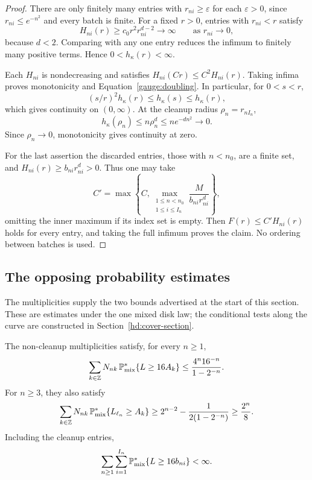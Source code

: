 \begin{proof}
There are only finitely many entries with \(r_{ni}\ge\varepsilon\)
for each \(\varepsilon>0\), since \(r_{ni}\le e^{-n^2}\) and
every batch is finite. For a fixed \(r>0\), entries with
\(r_{ni}<r\) satisfy
\[
H_{ni}(r)\ge c_0r^2r_{ni}^{d-2}\longrightarrow\infty
\qquad\text{as }r_{ni}\longrightarrow0,
\]
because \(d<2\). Comparing with any one entry reduces the infimum
to finitely many positive terms. Hence \(0<h_\kappa(r)<\infty\).

Each \(H_{ni}\) is nondecreasing and satisfies
\(H_{ni}(Cr)\le C^2H_{ni}(r)\). Taking infima proves
monotonicity and Equation~\eqref{gauge:doubling}. In particular,
for \(0<s<r\),
\[
(s/r)^2h_\kappa(r)\le h_\kappa(s)\le h_\kappa(r),
\]
which gives continuity on \((0,\infty)\). At the cleanup radius
\(\rho_n=r_{nI_n}\),
\[
h_\kappa(\rho_n)\le n\rho_n^d\le ne^{-dn^2}\longrightarrow0.
\]
Since \(\rho_n\to0\), monotonicity gives continuity at zero.

For the last assertion the discarded entries, those with \(n<n_0\),
are a finite set, and \(H_{ni}(r)\ge b_{ni}r_{ni}^d>0\).
Thus one may take
\[
C'=\max\left\{C,
\max_{\substack{1\le n<n_0\\1\le i\le I_n}}
\frac{M}{b_{ni}r_{ni}^d}\right\},
\]
omitting the inner maximum if its index set is empty.
Then \(F(r)\le C'H_{ni}(r)\) holds for every entry, and taking
the full infimum proves the claim. No ordering between batches
is used.
\end{proof}

\subsection{The opposing probability estimates}

The multiplicities supply the two bounds advertised at the start of
this section. These are estimates under the one mixed disk law; the
conditional tests along the curve are constructed in
Section~\ref{hd:cover-section}.

\begin{lemma}\label{gauge:multiplicity}
The non-cleanup multiplicities satisfy, for every \(n\ge1\),
\begin{equation}\label{gauge:upper-tail}
\sum_{k\in\mathbb Z}N_{nk}\,
\mathbb P^*_{\mathrm{mix}}\{L\ge16A_k\}
\le\frac{4^n16^{-n}}{1-2^{-n}}.
\end{equation}
For \(n\ge3\), they also satisfy
\begin{equation}\label{gauge:success}
\sum_{k\in\mathbb Z}N_{nk}\,
\mathbb P^*_{\mathrm{mix}}\{L_{\ell_n}\ge A_k\}
\ge 2^{n-2}-\frac{1}{2(1-2^{-n})}
\ge\frac{2^n}{8}.
\end{equation}
Including the cleanup entries,
\begin{equation}\label{gauge:tail-summability}
\sum_{n\ge1}\sum_{i=1}^{I_n}
\mathbb P^*_{\mathrm{mix}}\{L\ge16b_{ni}\}<\infty.
\end{equation}
\end{lemma}

